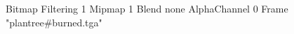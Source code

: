 {Bitmap
	{Filtering 1}
	{Mipmap 1}
	{Blend none}
	{AlphaChannel 0}
	{Frame "plantree#burned.tga"}
}
